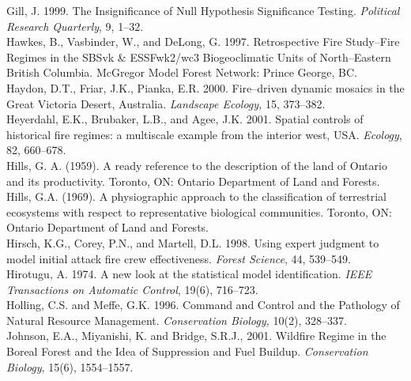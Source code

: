 \begin{spacing}{1.5}
\clearpage

\noindent Gill, J. 1999. The Insignificance of Null Hypothesis Significance Testing. \emph{Political Research Quarterly}, 9, 1--32.\\

\noindent Hawkes, B., Vasbinder, W., and DeLong, G. 1997. Retrospective Fire Study--Fire Regimes in the SBSvk \& ESSFwk2/wc3 Biogeoclimatic Units of North--Eastern British Columbia. McGregor Model Forest Network: Prince George, BC.\\

\noindent Haydon, D.T., Friar, J.K., Pianka, E.R. 2000. Fire--driven dynamic mosaics in the Great Victoria Desert, Australia. \emph{Landscape Ecology,} 15, 373--382.\\

\noindent Heyerdahl, E.K., Brubaker, L.B., and Agee, J.K. 2001. Spatial controls of historical fire regimes: a multiscale example from the interior west, USA. \emph{Ecology}, 82, 660--678.\\

\noindent Hills, G. A. (1959). A ready reference to the description of the land of Ontario and its productivity. Toronto, ON: Ontario Department of Land and Forests.\\

\noindent Hills, G.A. (1969). A physiographic approach to the classification of terrestrial ecosystems with respect to representative biological communities. Toronto, ON: Ontario Department of Land and Forests.\\

\noindent Hirsch, K.G., Corey, P.N., and Martell, D.L. 1998. Using expert judgment to model initial attack fire crew effectiveness. \emph{Forest Science}, 44, 539--549.\\

\noindent Hirotugu, A. 1974. A new look at the statistical model identification. \emph{IEEE Transactions on Automatic Control}, 19(6), 716--723.\\

\noindent Holling, C.S. and Meffe, G.K. 1996. Command and Control and the Pathology of Natural Resource Management. \emph{Conservation Biology,} 10(2), 328--337.\\

\noindent Johnson, E.A., Miyanishi, K. and Bridge, S.R.J., 2001. Wildfire Regime in the Boreal Forest and the Idea of Suppression and Fuel Buildup. \emph{Conservation Biology}, 15(6), 1554--1557.\\


\end{spacing}
